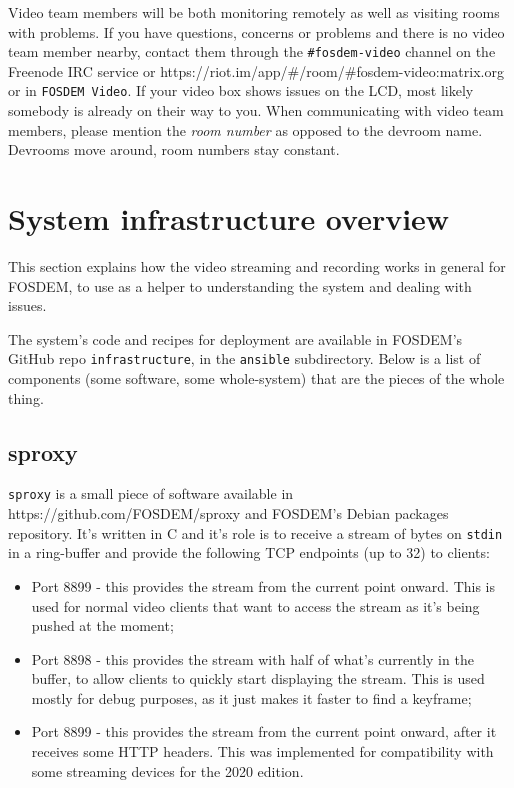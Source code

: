 \documentclass{article}
\begin{document}
Video team members will be both monitoring remotely as well as visiting rooms with problems. If you have questions, concerns or problems and there is no video team member nearby, contact them through the \texttt{\#fosdem-video} channel on the Freenode IRC service or https://riot.im/app/\#/room/\#fosdem-video:matrix.org or in \texttt{FOSDEM Video}. If your video box shows issues on the LCD, most likely somebody is already on their way to you. When communicating with video team members, please mention the \emph{room number} as opposed to the devroom name. Devrooms move around, room numbers stay constant.

\section{System infrastructure overview}

This section explains how the video streaming and recording works in general for FOSDEM, to use as a helper to understanding the system and dealing with issues.

The system's code and recipes for deployment are available in FOSDEM's GitHub repo \texttt{infrastructure}, in the \texttt{ansible} subdirectory. Below is a list of components (some software, some whole-system) that are the pieces of the whole thing.

\subsection{sproxy}

\texttt{sproxy} is a small piece of software available in https://github.com/FOSDEM/sproxy and FOSDEM's Debian packages repository. It's written in C and it's role is to receive a stream of bytes on \texttt{stdin} in a ring-buffer and provide the following TCP endpoints (up to 32) to clients:

\begin{itemize}
  \item Port 8899 - this provides the stream from the current point onward. This is used for normal video clients that want to access the stream as it's being pushed at the moment;
  \item Port 8898 - this provides the stream with half of what's currently in the buffer, to allow clients to quickly start displaying the stream. This is used mostly for debug purposes, as it just makes it faster to find a keyframe;
  \item Port 8899 - this provides the stream from the current point onward, after it receives some HTTP headers. This was implemented for compatibility with some streaming devices for the 2020 edition.
\end{itemize}
\end{document}
